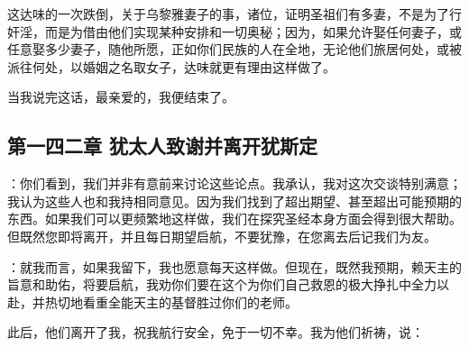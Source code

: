 这达味的一次跌倒，关于乌黎雅妻子的事，诸位，证明圣祖们有多妻，不是为了行奸淫，而是为借由他们实现某种安排和一切奥秘；因为，如果允许娶任何妻子，或任意娶多少妻子，随他所愿，正如你们民族的人在全地，无论他们旅居何处，或被派往何处，以婚姻之名取女子，达味就更有理由这样做了。\par

当我说完这话，最亲爱的，我便结束了。\par


\subsection{第一四二章 犹太人致谢并离开犹斯定}

：你们看到，我们并非有意前来讨论这些论点。我承认，我对这次交谈特别满意；我认为这些人也和我持相同意见。因为我们找到了超出期望、甚至超出可能预期的东西。如果我们可以更频繁地这样做，我们在探究圣经本身方面会得到很大帮助。但既然您即将离开，并且每日期望启航，不要犹豫，在您离去后记我们为友。\par

：就我而言，如果我留下，我也愿意每天这样做。但现在，既然我预期，赖天主的旨意和助佑，将要启航，我劝你们要在这个为你们自己救恩的极大挣扎中全力以赴，并热切地看重全能天主的基督胜过你们的老师。\par

此后，他们离开了我，祝我航行安全，免于一切不幸。我为他们祈祷，说：\par

